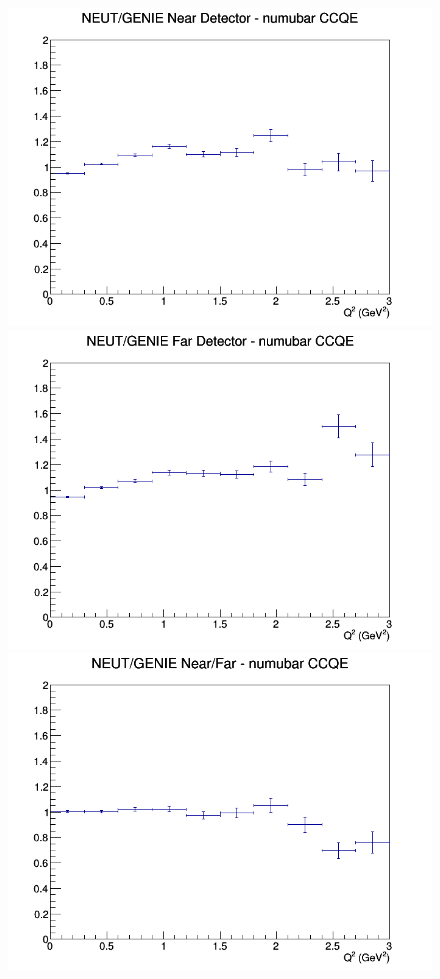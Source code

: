 \documentclass[12pt]{article}
\begin{document}
\begin{figure}[h]
\includegraphics[width=\linewidth]{Q2/nominal/ratios/CCQE_NEUT_GENIE_numubar_near_Q2.png}
\endminipage
{}
\includegraphics[width=\linewidth]{Q2/nominal/ratios/CCQE_NEUT_GENIE_numubar_far_Q2.png}
\endminipage
{}
\includegraphics[width=\linewidth]{Q2/nominal/ratios/CCQE_NEUT_GENIE_numubar_NF_Q2.png}

\end{figure}
\end{document}
